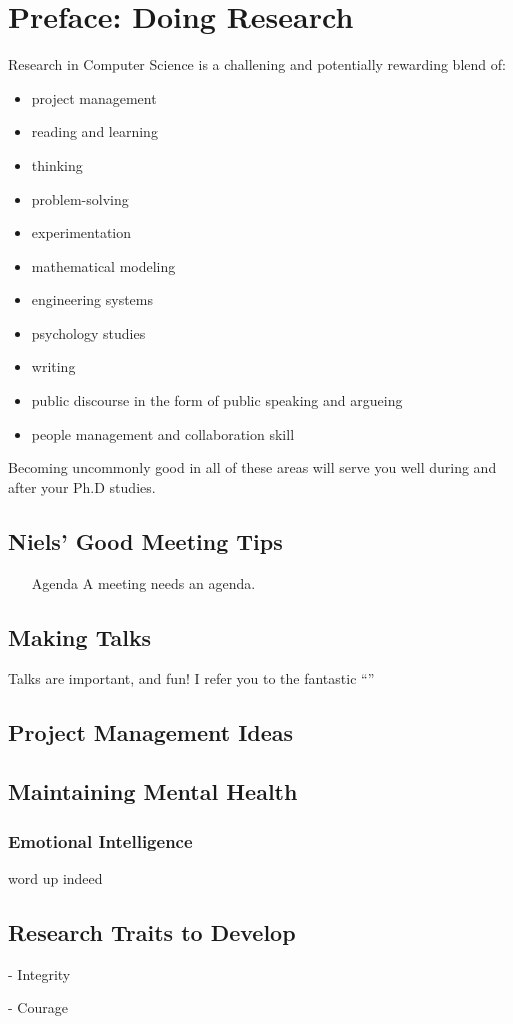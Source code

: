 \chapter{Preface: Doing Research}

Research in Computer Science is a challening and potentially rewarding blend of:
\begin{itemize}
\item project management
\item reading and learning
\item thinking
\item problem-solving
\item experimentation
\item mathematical modeling
\item engineering systems
\item psychology studies
\item writing
\item public discourse in the form of public speaking and argueing
\item people management and collaboration skill
\end{itemize}
Becoming uncommonly good in all of these areas will serve you well during and after your Ph.D studies.

\section{Niels' Good Meeting Tips}

\begin{itemize}

\item[Agenda] A meeting needs an agenda. 

\end{itemize}

\section{Making Talks}
Talks are important, and fun! I refer you to the fantastic ``''

\section{Project Management Ideas}

\section{Maintaining Mental Health}

\subsection{Emotional Intelligence}

word up
indeed

\section{Research Traits to Develop}

- Integrity

- Courage
